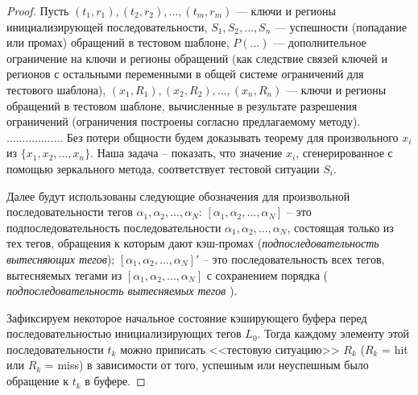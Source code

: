 \theoremtext{\ref{mirror_correctness}}{\CorrectnessMirror}
\begin{proof}
  Пусть $(t_1, r_1), (t_2, r_2), \dots, (t_m, r_m)$ --- ключи и регионы инициализирующей последовательности, $S_1, S_2, \dots, S_n$ --- успешности (попадание или промах) обращений в тестовом шаблоне, $P(...)$ --- дополнительное ограничение на ключи и регионы обращений (как следствие связей ключей и регионов с остальными переменными в общей системе ограничений для тестового шаблона), $(x_1, R_1), (x_2, R_2), \dots, (x_n, R_n)$ --- ключи и регионы обращений в тестовом шаблоне, вычисленные в результате разрешения ограничений (ограничения построены согласно предлагаемому методу).
..................
  Без потери общности будем доказывать теорему для произвольного
  $x_i$ из $\{x_1, x_2, \dots, x_n\}$. Наша задача -- показать, что значение $x_i$,
  сгенерированное с помощью зеркального метода, соответствует
  тестовой ситуации $S_i$.

  Далее будут использованы следующие обозначения для произвольной
  последовательности тегов $\alpha_1, \alpha_2, ..., \alpha_N$:
  $[\alpha_1, \alpha_2, ..., \alpha_N]$ -- это подпоследовательность
  последовательности $\alpha_1, \alpha_2, ..., \alpha_N$, состоящая
  только из тех тегов, обращения к которым дают кэш-промах
  (\emph{подпоследовательность вытесняющих тегов}); $[\alpha_1,
  \alpha_2, ..., \alpha_N]'$ -- это последовательность всех тегов,
  вытесняемых тегами из $[\alpha_1, \alpha_2, ..., \alpha_N]$ с
  сохранением порядка ( \emph{подпоследовательность вытесняемых
  тегов} ).

  Зафиксируем некоторое начальное состояние кэширующего буфера перед
  последовательностью инициализирующих тегов $L_0$. Тогда каждому
  элементу этой последовательности $t_k$ можно приписать <<тестовую
  ситуацию>> $R_k$ ($R_k$ = hit или $R_k$ = miss) в зависимости от
  того, успешным или неуспешным было обращение к $t_k$ в буфере.


\end{proof}
